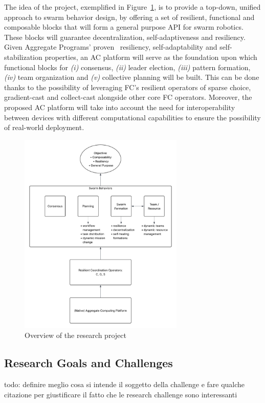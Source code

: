 \documentclass[12pt]{article}
\begin{document}
The idea of the project, exemplified in Figure~\ref{fig:research-project}, is to provide a top-down, unified approach to swarm behavior design, by offering a
set of resilient, functional and composable blocks that will form a general purpose API for swarm robotics. These blocks will guarantee decentralization, self-adaptiveness and resiliency.
Given Aggregate Programs' proven~\cite{viroli2018engineering} resiliency, self-adaptability and self-stabilization properties, an AC platform will serve as the
foundation upon which functional blocks for \textit{(i)} consensus, \textit{(ii)} leader election, \textit{(iii)} pattern formation,
\textit{(iv)} team organization and \textit{(v)} collective planning will be built. This can be done thanks to the possibility of leveraging FC's resilient operators of sparse choice, 
gradient-cast and collect-cast alongside other core FC operators. Moreover, the proposed AC platform will take into account the need for interoperability between devices with different 
computational capabilities to ensure the possibility of real-world deployment.

\begin{figure}
	\centering
	\includegraphics[width=0.7\textwidth]{figures/ResearchProject.png}
	\caption{Overview of the research project}
	 \label{fig:research-project}
\end{figure}

\subsection{Research Goals and Challenges}
\label{sec:challenges}
todo: definire meglio cosa si intende il soggetto della challenge e fare qualche citazione per giustificare il fatto che le research challenge sono interessanti
\end{document}
